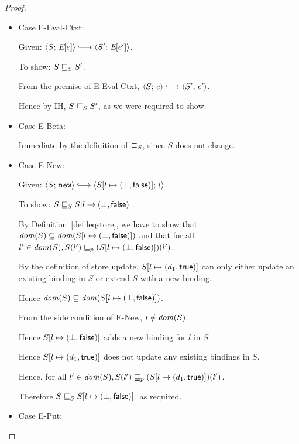\begin{proof}
  \begin{itemize}

    \item Case {\sc E-Eval-Ctxt}:

      Given: $\config{S}{\E{e}} \parstepsto \config{S'}{\E{e'}}$.

      To show: $S \sqsubseteq_S S'$.

      From the premise of {\sc E-Eval-Ctxt}, $\config{S}{e}
      \parstepsto \config{S'}{e'}$.

      Hence by IH, $S \sqsubseteq_S S'$, as we were required to show.

    \item Case {\sc E-Beta}:

      Immediate by the definition of $ \sqsubseteq_S $, since $S$ does
      not change.

    \item Case {\sc E-New}:

      Given: $\config{S}{\NEW} \parstepsto
      \config{\extS{S}{l}{\bot}{\frozenfalse}}{l}$.

      To show: $S \sqsubseteq_S S[l \mapsto (\bot, \textsf{false})]$.

      By Definition~\ref{def:leqstore}, we have to show that $\mathit{dom}(S)
      \subseteq \mathit{dom}(S[l \mapsto (\bot, \textsf{false})])$ and that for
      all $l' \in \mathit{dom}(S), \\
      S(l') \sqsubseteq_p (S[l \mapsto (\bot, \textsf{false})])(l')$.

      By the definition of store update,
      $S[l \mapsto (d_1, \textsf{true})]$ can only either update an
      existing binding in $S$ or extend $S$ with a new binding.

      Hence $\mathit{dom}(S) \subseteq \mathit{dom}(S[l \mapsto (\bot, \textsf{false})])$.

      From the side condition of {\sc E-New}, $l \notin \mathit{dom}(S)$.

      Hence $S[l \mapsto (\bot, \textsf{false})]$ adds a new binding for
      $l$ in $S$.

      Hence $S[l \mapsto (d_1, \textsf{true})]$ does not update any
      existing bindings in $S$.

      Hence, for all $l' \in \mathit{dom}(S), S(l') \sqsubseteq_p
      (S[l \mapsto (d_1, \textsf{true})])(l')$.

      Therefore $S \sqsubseteq_S S[l \mapsto (\bot, \textsf{false})]$, as
      required.

    \item Case {\sc E-Put}:


\end{itemize}
\end{proof}
